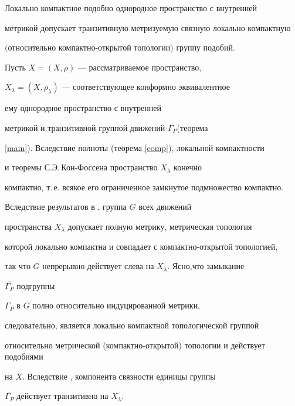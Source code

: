 \begin{props}


\label{prop}


Локально компактное подобно однородное пространство с внутренней


метрикой допускает транзитивную метризуемую связную локально компактную


$($от\-но\-си\-тель\-но компактно-открытой топологии$)$ группу подобий.


\end{props}





\begin{pf}


Пусть $X=(X,\rho)$ --- рассматриваемое пространство,


$X_{\lambda}=(X,\rho_{\lambda})$ --- соответствующее конформно эквивалентное


ему однородное пространство с внутренней


метрикой и транзитивной группой движений $\Gamma_{P}$(теорема


\ref{main}). Вследствие полноты (теорема \ref{comp}), локальной компактности


и теоремы С.Э.\,Кон-Фоссена \cite{CV} пространство $X_{\lambda}$ конечно


компактно, т.\,е. всякое его ограниченное замкнутое подмножество компактно.


Вследствие результатов в \cite{BB}, \cite{B3} группа $G$ всех движений


пространства $X_{\lambda}$ допускает полную метрику, метрическая топология


которой локально компактна и совпадает с компактно-открытой топологией,


так что $G$ непрерывно действует слева на $X_{\lambda}$. Ясно,что замыкание


$\overline{\Gamma_{P}}$ подгруппы


$\Gamma_{P}$ в $G$ полно относительно индуцированной метрики,


следовательно, является локально компактной топологической группой


относительно метрической (компактно-открытой) топологии и действует подобиями


на $X$. Вследствие \cite{BB}, компонента связности единицы группы


$\overline{\Gamma_{P}}$ действует транзитивно на $X_{\lambda}$.


\end{pf}





